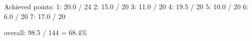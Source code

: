 Achieved points:
1: 20.0 / 24
2: 15.0 / 20
3: 11.0 / 20
4: 19.5 / 20
5: 10.0 / 20
6: 6.0 / 20
7: 17.0 / 20

overall: 98.5 / 144 = 68.4\%

